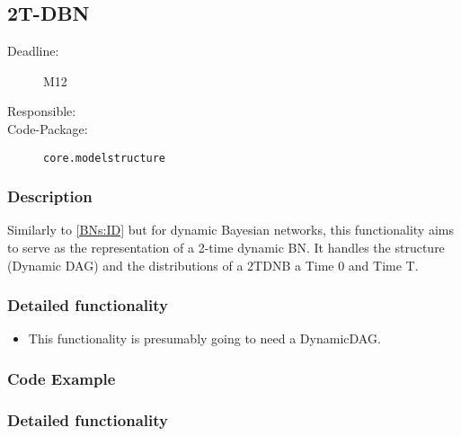 \newpage
\subsection{2T-DBN}
\label{2TDBN:ID}

\begin{description}
\item[Deadline:] M12
\item[Responsible:]
\item[Code-Package:] \texttt{core.modelstructure}
\end{description}

\subsubsection*{Description}

Similarly to \ref{BNs:ID} but for dynamic Bayesian networks, this functionality aims to serve as the representation of a 2-time dynamic BN. It handles the structure (Dynamic DAG) and the distributions of a 2TDNB a Time 0 and Time T. 


\subsubsection*{Detailed functionality}

\begin{itemize}
\item This functionality is presumably going to need a DynamicDAG.
\end{itemize}

\subsubsection*{Code Example}


\subsubsection*{Detailed functionality}
